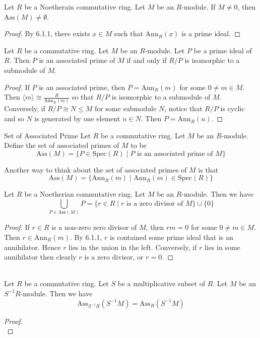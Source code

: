 \documentclass[a4paper]{article}
\begin{document}
\begin{lmm}{}{} Let $R$ be a Noetherain commutative ring. Let $M$ be an $R$-module. If $M\neq 0$, then $\text{Ass}(M)\neq\emptyset$. 
\begin{proof}
By 6.1.1, there exists $x\in M$ such that $\text{Ann}_R(x)$ is a prime ideal. 
\end{proof}
\end{lmm}

\begin{lmm}{}{} Let $R$ be a commutative ring. Let $M$ be an $R$-module. Let $P$ be a prime ideal of $R$. Then $P$ is an associated prime of $M$ if and only if $R/P$ is isomorphic to a submodule of $M$. 
\begin{proof}
If $P$ is an associated prime, then $P=\text{Ann}_R(m)$ for some $0\neq m\in M$. Then $\langle m\rangle\cong\frac{R}{\text{Ann}_R(m)}$ so that $R/P$ is isomorphic to a submodule of $M$. Conversely, if $R/P\cong N\leq M$ for some submodule $N$, notice that $R/P$ is cyclic and so $N$ is generated by one element $n\in N$. Then $P=\text{Ann}_R(n)$. 
\end{proof}
\end{lmm}

\begin{defn}{Set of Associated Prime}{} Let $R$ be a commutative ring. Let $M$ be an $R$-module. Define the set of associated primes of $M$ to be $$\text{Ass}(M)=\{P\in\text{Spec}(R)\;|\;P\text{ is an associated prime of }M\}$$
\end{defn}

Another way to think about the set of associated primes of $M$ is that $$\text{Ass}(M)=\{\text{Ann}_R(m)\;|\;\text{Ann}_R(m)\in\text{Spec}(R)\}$$

\begin{lmm}{}{} Let $R$ be a Noetherian commutative ring. Let $M$ be an $R$-module. Then we have $$\bigcup_{P\in\text{Ass}(M)}P=\{r\in R\;|\;r\text{ is a zero divisor of }M\}\cup\{0\}$$ 
\begin{proof}
If $r\in R$ is a non-zero zero divisor of $M$, then $rm=0$ for some $0\neq m\in M$. Then $r\in\text{Ann}_R(m)$. By 6.1.1, $r$ is contained some prime ideal that is an annihilator. Hence $r$ lies in the union in the left. Conversely, if $r$ lies in some annihilator then clearly $r$ is a zero divisor, or $r=0$. 
\end{proof}
\end{lmm}

\begin{prp}{}{}\\
Let $R$ be a commutative ring. Let $S$ be a multiplicative subset of $R$. Let $M$ be an $S^{-1}R$-module. Then we have $$\text{Ass}_{S^{-1}R}(S^{-1}M)=\text{Ass}_R(S^{-1}M)$$
\begin{proof}\\

\end{proof}
\end{prp}
\end{document}
